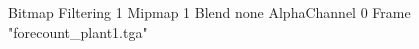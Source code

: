 {Bitmap
	{Filtering 1}
	{Mipmap 1}
	{Blend none}
	{AlphaChannel 0}
	{Frame "forecount_plant1.tga"}
}
